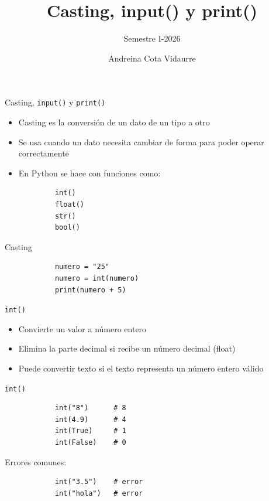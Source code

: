 \documentclass{beamer}
\title{Casting, input() y print()} %
\subtitle{Semestre I-2026} %
\author{Andreina Cota Vidaurre}
\begin{document}
  \shorthandoff{-}
  \frame[c]{\maketitle}


    \begin{frame}[fragile,t]{Casting, \texttt{input()} y \texttt{print()}}
        \begin{itemize}
            \item Casting es la conversión de un dato de un tipo a otro
            \item Se usa cuando un dato necesita cambiar de forma para poder operar correctamente
            \item En Python se hace con funciones como:
        \end{itemize}
        \begin{verbatim}
            int()
            float()
            str()
            bool()
        \end{verbatim}
    \end{frame}

    \begin{frame}[fragile,t]{Casting}
        \begin{verbatim}
            numero = "25"
            numero = int(numero)
            print(numero + 5)
        \end{verbatim}
    \end{frame}

    \begin{frame}{\texttt{int()}}
         \begin{itemize}
            \item Convierte un valor a número entero
            \item Elimina la parte decimal si recibe un número decimal (float)
            \item Puede convertir texto si el texto representa un número entero válido
         \end{itemize}
    \end{frame}

    \begin{frame}[fragile,t]{\texttt{int()}}
         \begin{verbatim}
            int("8")      # 8
            int(4.9)      # 4
            int(True)     # 1
            int(False)    # 0
        \end{verbatim}
        Errores comunes:
        \begin{verbatim}
            int("3.5")    # error
            int("hola")   # error
        \end{verbatim}
    \end{frame}
\end{document}
